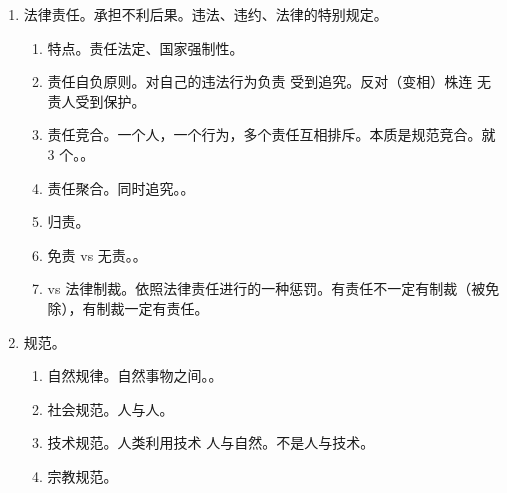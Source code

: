 \begin{enumerate}
\begin{enumerate}
\begin{enumerate}
                  \item 精神产品。知识产权。
                  \item 行为结果。\bdy 行为。和民法有点小差别。
                        \begin{enumerate}
                          \item 物化。看得见摸得着。行为 + 结果都不能出问题。。
                          \item 非物化。。
                        \end{enumerate}
                \end{enumerate}
          \item 法律关系的产生、变更、消灭 = 法律规范 + 法律事实（事件/行为 \yjt 不以/以当事人的意志为转移）。
                \begin{enumerate}
                  \item 单一事实。一个事实影响[一个 \hz 多个]法律关系。
                  \item 事实构成。多个事实共同影响一个法律关系。多对一。。
                \end{enumerate}
        \end{enumerate}
  \item 法律责任。承担不利后果。违法、违约、法律的特别规定。
        \begin{enumerate}
          \item 特点。责任法定、国家强制性。
          \item 责任自负原则。对自己的违法行为负责 \yjt 受到追究。反对（变相）株连 \yjt 无责人受到保护。
          \item 责任竞合。一个人，一个行为，多个责任互相排斥。本质是规范竞合。就 3 个。。
          \item 责任聚合。同时追究。。
          \item 归责。
          \item 免责 vs 无责。。
          \item vs 法律制裁。依照法律责任进行的一种惩罚。有责任不一定有制裁（被免除），有制裁一定有责任。
        \end{enumerate}
  \item 规范。
        \begin{enumerate}
          \item 自然规律。自然事物之间。。
          \item 社会规范。人与人。
          \item 技术规范。人类利用技术 \yjt 人与自然。不是人与技术。
          \item 宗教规范。
        \end{enumerate}
\end{enumerate}
